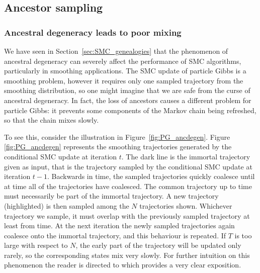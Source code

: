\subsection{Ancestor sampling \seb{$\sim$} } \label{sec:ancsamp}







\subsubsection{Ancestral degeneracy leads to poor mixing}
We have seen in Section~\ref{sec:SMC_genealogies} that the phenomenon of ancestral degeneracy can severely affect the performance of SMC algorithms, particularly in smoothing applications.
The SMC update of particle Gibbs is a smoothing problem, however it requires only one sampled trajectory from the smoothing distribution, so one might imagine that we are safe from the curse of ancestral degeneracy.
In fact, the loss of ancestors causes a different problem for particle Gibbs: it prevents some components of the Markov chain being refreshed, so that the chain mixes slowly.

To see this, consider the illustration in Figure~\ref{fig:PG_ancdegen}. 
Figure \ref{fig:PG_ancdegen} represents the smoothing trajectories generated by the conditional SMC update at iteration $t$. The dark line is the immortal trajectory given as input, that is the trajectory sampled by the conditional SMC update at iteration $t-1$. Backwards in time, the sampled trajectories quickly coalesce until at time  all of the trajectories have coalesced. The common trajectory up to time must necessarily be part of the immortal trajectory.
A new trajectory (highlighted) is then sampled among the $N$ trajectories shown. Whichever trajectory we sample, it must overlap with the previously sampled trajectory at least from time.
At the next iteration the newly sampled trajectories again coalesce onto the immortal trajectory, and this behaviour is repeated. 
If $T$ is too large with respect to $N$, the early part of the trajectory will be updated only rarely, so the corresponding states mix very slowly.
For further intuition on this phenomenon the reader is directed to \textcite[Section 5.4]{lindsten2013} which provides a very clear exposition.

